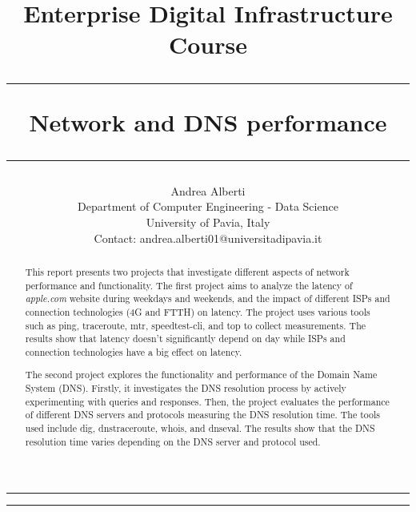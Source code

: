 \documentclass[a4paper,10pt]{article}
\title{\Large {Enterprise Digital Infrastructure Course} \vspace{0.2cm}
     \rule{\textwidth}{0.3pt} \vspace{0.1cm} %
     \textbf{Network and DNS performance} \vspace{0.0cm} %
     \rule{\textwidth}{0.3pt}}
\author{Andrea Alberti \vspace{0.1cm}\\
        \small Department of Computer Engineering - Data Science \vspace{0.2cm}\\
        \small University of Pavia, Italy \vspace{0.2cm}\\
        \small Contact: andrea.alberti01@universitadipavia.it}
\begin{document}

\begin{titlepage}
        \maketitle 
        \thispagestyle{empty} 
\begin{multicols*}{2}
        \hrule
        \tableofcontents
        \newcolumn
        \hrule
        \begin{abstract}
                \noindent
                This report presents two projects that investigate different aspects of network performance and functionality. The first project aims to analyze 
                the latency of \textit{apple.com} website during weekdays and weekends, and the impact of different ISPs and connection technologies 
                (4G and FTTH) on latency. The project uses various tools such as ping, traceroute, mtr, speedtest-cli, and top to collect measurements. 
                The results show that latency doesn't significantly depend on day while ISPs and connection technologies have a big effect on latency.

                The second project explores the functionality and performance of the Domain Name System (DNS). Firstly, it investigates the DNS resolution 
                process by actively experimenting with queries and responses. Then, the project evaluates the performance of different DNS servers and protocols 
                measuring the DNS resolution time. The tools used include dig, dnstraceroute, whois, and dnseval. The results show that the DNS resolution time varies depending on the DNS server and protocol used.
        \end{abstract}
        
\end{multicols*}
\end{titlepage}




\newpage
\listoffigures
\listoftables

\thispagestyle{empty}
\newpage
\end{document}
